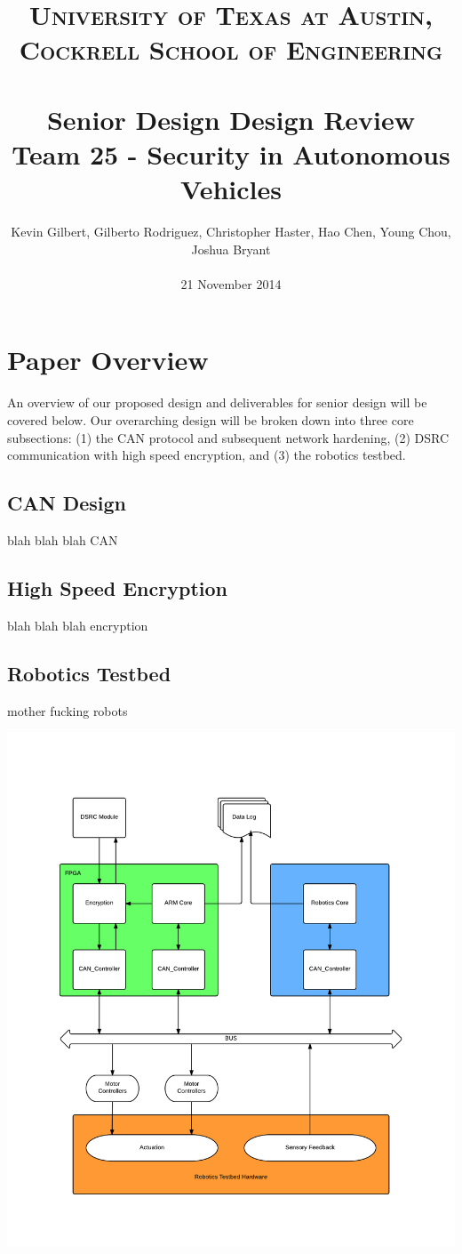 \documentclass[paper=a4, fontsize=11pt]{scrartcl}
\title{
		\usefont{OT1}{bch}{b}{n}
		\normalfont \normalsize \textsc{University of Texas at Austin, Cockrell School of Engineering} \\ [25pt]
		\horrule{0.5pt} \\[0.4cm]
		\huge Senior Design Design Review\\
        Team 25 - Security in Autonomous Vehicles
		\horrule{2pt} \\[0.5cm]
}
\author{
		\normalfont \normalsize
        Kevin Gilbert, Gilberto Rodriguez, Christopher Haster, Hao Chen, Young Chou, Joshua Bryant\\[-3pt]\\
        \normalsize
        21 November 2014
}
\date{}
\numberwithin{equation}{section}		%
\numberwithin{figure}{section}			%
\numberwithin{table}{section}				%
\begin{document}
\maketitle

\newpage

\section{Paper Overview}
An overview of our proposed design and deliverables for senior design will be covered below. Our overarching design will be broken down into three core subsections: (1) the CAN protocol and subsequent network hardening, (2) DSRC communication with high speed encryption, and (3) the robotics testbed.

\subsection{CAN Design}
blah blah blah CAN

\subsection{High Speed Encryption}
blah blah blah encryption

\subsection{Robotics Testbed}
mother fucking robots

\begin{center}
	\includegraphics[width = \textwidth]{images/Bus_Layout}
\end{center}

\end{document}
